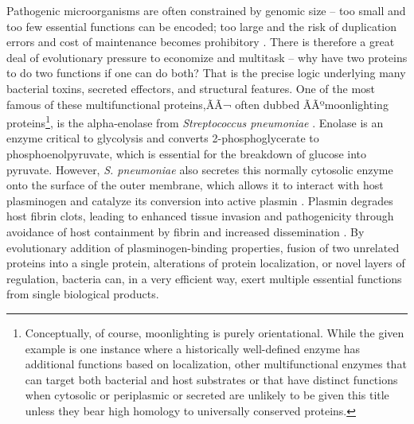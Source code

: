Pathogenic microorganisms are often constrained by genomic size -- too small and too few essential functions can be encoded; too large and the risk of duplication errors and cost of maintenance becomes prohibitory \citep{Ranea2005, Bobay2017}. There is therefore a great deal of evolutionary pressure to economize and multitask -- why have two proteins to do two functions if one can do both? That is the precise logic underlying many bacterial toxins, secreted effectors, and structural features. One of the most famous of these multifunctional proteins,ÃÃ¬ often dubbed ÃÃºmoonlighting proteins\footnote{Conceptually, of course, moonlighting is purely orientational. While the given example is one instance where a historically well-defined enzyme has additional functions based on localization, other multifunctional enzymes that can target both bacterial and host substrates or that have distinct functions when cytosolic or periplasmic or secreted are unlikely to be given this title unless they bear high homology to universally conserved proteins.}, is the alpha-enolase from \textit{Streptococcus pneumoniae} \citep{Bergmann2001}. Enolase is an enzyme critical to glycolysis and converts 2-phosphoglycerate to phosphoenolpyruvate, which is essential for the breakdown of glucose into pyruvate. However, \textit{S. pneumoniae} also secretes this normally cytosolic enzyme onto the surface of the outer membrane, which allows it to interact with host plasminogen and catalyze its conversion into active plasmin \citep{Bergmann2013}. Plasmin degrades host fibrin clots, leading to enhanced tissue invasion and pathogenicity through avoidance of host containment by fibrin and increased dissemination \citep{Whiting2002, Weiser2018}. By evolutionary addition of plasminogen-binding properties, fusion of two unrelated proteins into a single protein, alterations of protein localization, or novel layers of regulation, bacteria can, in a very efficient way, exert multiple essential functions from single biological products.

